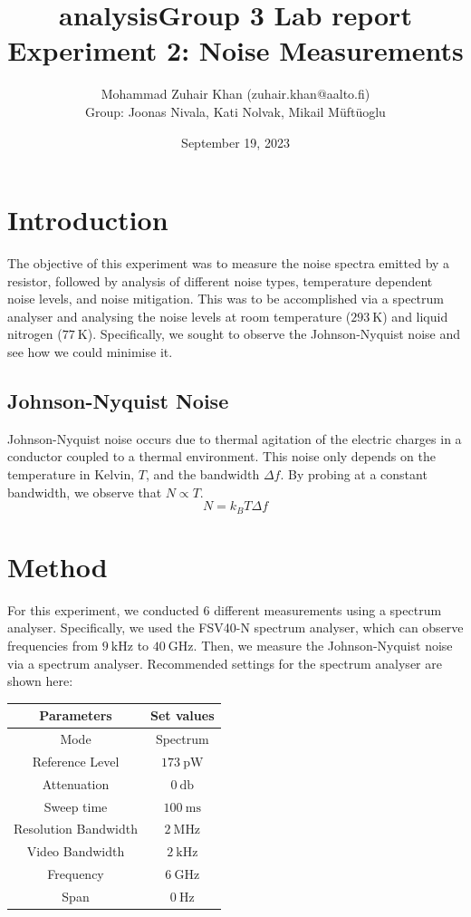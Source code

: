 \documentclass[english,12pt,a4paper]{article}
\title{analysis}
\title{Group 3 Lab report\\Experiment 2: Noise Measurements}
\author{Mohammad Zuhair Khan (zuhair.khan@aalto.fi)\\Group: Joonas Nivala, Kati Nolvak, Mikail Müftüoglu}
\date{September 19, 2023}
\begin{document}
\maketitle
\newpage
\tableofcontents
\newpage
\section{Introduction}
The objective of this experiment was to measure the noise spectra emitted by a resistor, followed by analysis of different noise types, temperature dependent noise levels, and noise mitigation\autocite{morstedtExperimentNoiseMeasurements2023}. This was to be accomplished via a spectrum analyser and analysing the noise levels at room temperature ($\qty{293}{\kelvin}$) and liquid nitrogen ($\qty{77}{\kelvin}$). Specifically, we sought to observe the Johnson-Nyquist noise\autocite{nyquistThermalAgitationElectric1928} and see how we could minimise it.
\subsection{Johnson-Nyquist Noise}
Johnson-Nyquist noise occurs due to thermal agitation of the electric charges in a conductor coupled to a thermal environment\autocite{morstedtExperimentNoiseMeasurements2023,nyquistThermalAgitationElectric1928}. This noise only depends on the temperature in Kelvin, $T$, and the bandwidth $\Delta f$. By probing at a constant bandwidth, we observe that $N \propto T$.
\begin{equation}
	N = k_BT\Delta f
\end{equation}
\section{Method}
For this experiment, we conducted $6$ different measurements using a spectrum analyser. Specifically, we used the FSV40-N spectrum analyser, which can observe frequencies from $\qty{9}{\kilo\hertz}$ to $\qty{40}{\giga\hertz}$. Then, we measure the Johnson-Nyquist noise via a spectrum analyser. Recommended settings for the spectrum analyser are shown here: 

\begin{tabular}{|c|c|}
	\hline
	Parameters & Set values \\
	\hline
	Mode & Spectrum \\
	\hline
	Reference Level  & $\qty{173}{\pico\watt}$ \\
	\hline
	Attenuation &$\qty{0}{\decibel}$ \\
	\hline
	Sweep time & $\qty{100}{\milli\second}$\\
	\hline
	Resolution Bandwidth&  $\qty{2}{\mega\hertz}$ \\
	\hline
	Video Bandwidth &  $\qty{2}{\kilo\hertz}$ \\
	\hline
	Frequency & $\qty{6}{\giga\hertz}$ \\
	\hline
	Span &  $\qty{0}{\hertz}$\\
	\hline
\end{tabular}
\end{document}
